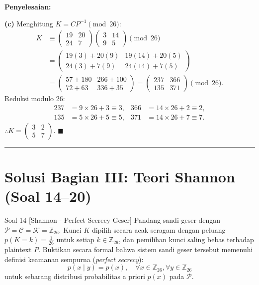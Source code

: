 \documentclass[11pt,a4paper]{article}
\newenvironment{solusi}{\noindent\textbf{\textsf{Penyelesaian:}}\par\vspace{0.2em}}{\hfill$\blacksquare$\vspace{1em}\par\hrule\vspace{1em}}
\begin{document}
\begin{solusi}
\textbf{(c)} Menghitung $K = C P^{-1} \pmod{26}$:
\begin{align*}
K &\equiv \begin{pmatrix} 19 & 20 \\ 24 & 7 \end{pmatrix} \begin{pmatrix} 3 & 14 \\ 9 & 5 \end{pmatrix} \pmod{26} \\
&= \begin{pmatrix} 19(3) + 20(9) & 19(14) + 20(5) \\ 24(3) + 7(9) & 24(14) + 7(5) \end{pmatrix} \\
&= \begin{pmatrix} 57 + 180 & 266 + 100 \\ 72 + 63 & 336 + 35 \end{pmatrix} = \begin{pmatrix} 237 & 366 \\ 135 & 371 \end{pmatrix} \pmod{26}.
\end{align*}
Reduksi modulo 26:
\begin{align*}
237 &= 9 \times 26 + 3 \equiv 3, & 366 &= 14 \times 26 + 2 \equiv 2, \\
135 &= 5 \times 26 + 5 \equiv 5, & 371 &= 14 \times 26 + 7 \equiv 7.
\end{align*}
$\therefore K = \begin{pmatrix} 3 & 2 \\ 5 & 7 \end{pmatrix}$.
\end{solusi}

\newpage
\section{Solusi Bagian III: Teori Shannon (Soal 14--20)}

\begin{soalshannon}{Soal 14 [Shannon - Perfect Secrecy Geser]}
Pandang sandi geser dengan $\mathcal{P} = \mathcal{C} = \mathcal{K} = \mathbb{Z}_{26}$. Kunci $K$ dipilih secara acak seragam dengan peluang $p(K = k) = \frac{1}{26}$ untuk setiap $k \in \mathbb{Z}_{26}$, dan pemilihan kunci saling bebas terhadap plaintext $P$.
Buktikan secara formal bahwa sistem sandi geser tersebut memenuhi definisi keamanan sempurna (\textit{perfect secrecy}):
\[
p(x \mid y) = p(x), \quad \forall x \in \mathbb{Z}_{26}, \forall y \in \mathbb{Z}_{26}
\]
untuk sebarang distribusi probabilitas a priori $p(x)$ pada $\mathcal{P}$.
\end{soalshannon}
\end{document}

